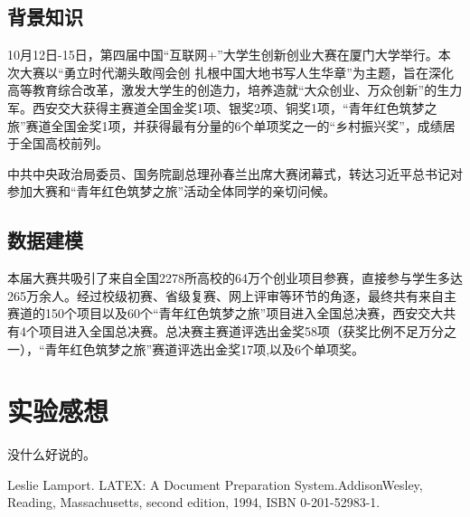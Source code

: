 \documentclass[a4paper,12pt]{report}
\begin{document}
\begin{spacing}{1.5}
\section{背景知识}

10月12日-15日，第四届中国“互联网+”大学生创新创业大赛在厦门大学举行。本次大赛以“勇立时代潮头敢闯会创 扎根中国大地书写人生华章”为主题，旨在深化高等教育综合改革，激发大学生的创造力，培养造就“大众创业、万众创新”的生力军。西安交大获得主赛道全国金奖1项、银奖2项、铜奖1项，“青年红色筑梦之旅”赛道全国金奖1项，并获得最有分量的6个单项奖之一的“乡村振兴奖”，成绩居于全国高校前列。

中共中央政治局委员、国务院副总理孙春兰出席大赛闭幕式，转达习近平总书记对参加大赛和“青年红色筑梦之旅”活动全体同学的亲切问候。

\section{数据建模}

本届大赛共吸引了来自全国2278所高校的64万个创业项目参赛，直接参与学生多达265万余人。经过校级初赛、省级复赛、网上评审等环节的角逐，最终共有来自主赛道的150个项目以及60个“青年红色筑梦之旅”项目进入全国总决赛，西安交大共有4个项目进入全国总决赛。总决赛主赛道评选出金奖58项（获奖比例不足万分之一），“青年红色筑梦之旅”赛道评选出金奖17项,以及6个单项奖。

\end{spacing}

\chapter{实验感想}
\begin{spacing}{1.5}
    没什么好说的。
\end{spacing}


\begin{thebibliography}{99}
\songti {}     
    Leslie Lamport. LATEX: A Document Preparation System.AddisonWesley, Reading, Massachusetts, second edition, 1994, ISBN 0-201-52983-1.
    
\end{thebibliography}
\end{document}

